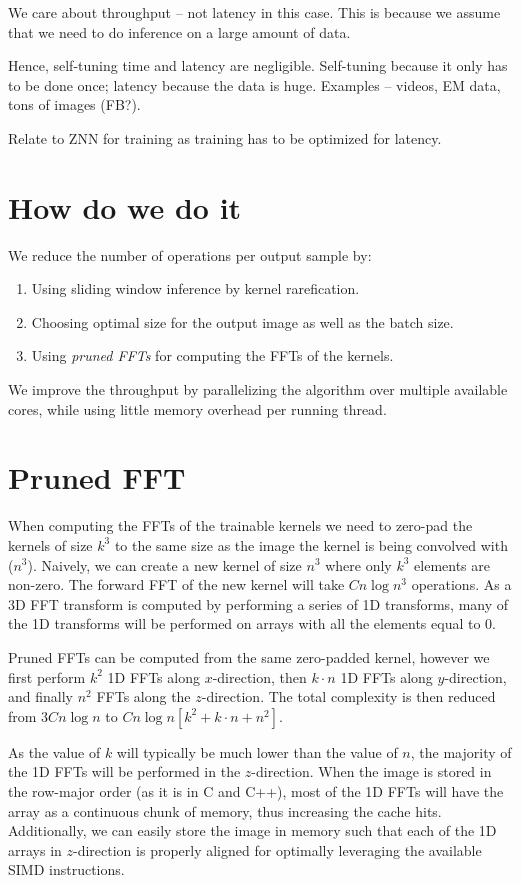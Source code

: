 \documentclass[conference]{IEEEtran}
\begin{document}
We care about throughput -- not latency in this case.  This is because
we assume that we need to do inference on a large amount of data.

Hence, self-tuning time and latency are negligible.  Self-tuning
because it only has to be done once; latency because the data is huge.
Examples -- videos, EM data, tons of images (FB?).

Relate to ZNN for training as training has to be optimized for
latency.

\section{How do we do it}

We reduce the number of operations per output sample by:
\begin{enumerate}
\item Using sliding window inference by kernel rarefication.
\item Choosing optimal size for the output image as well as the batch
  size.
\item Using \emph{pruned FFTs} for computing the FFTs of the kernels.
\end{enumerate}

We improve the throughput by parallelizing the algorithm over multiple
available cores, while using little memory overhead per running
thread.


\section{Pruned FFT}

When computing the FFTs of the trainable kernels we need to zero-pad
the kernels of size $k^3$ to the same size as the image the kernel is
being convolved with ($n^3$).  Naively, we can create a new kernel of
size $n^3$ where only $k^3$ elements are non-zero.  The forward FFT of
the new kernel will take $C n\log n^3$ operations.  As a 3D FFT
transform is computed by performing a series of 1D transforms, many of
the 1D transforms will be performed on arrays with all the elements
equal to $0$.

Pruned FFTs can be computed from the same zero-padded kernel, however
we first perform $k^2$ 1D FFTs along $x$-direction, then $k \cdot n$
1D FFTs along $y$-direction, and finally $n^2$ FFTs along the
$z$-direction.  The total complexity is then reduced from $3C n\log n$
to $C n\log n[k^2 + k \cdot n + n^2]$.

As the value of $k$ will typically be much lower than the value of
$n$, the majority of the 1D FFTs will be performed in the
$z$-direction.  When the image is stored in the row-major order (as it
is in C and C++), most of the 1D FFTs will have the array as a
continuous chunk of memory, thus increasing the cache hits.
Additionally, we can easily store the image in memory such that each
of the 1D arrays in $z$-direction is properly aligned for optimally
leveraging the available SIMD instructions.
\end{document}
